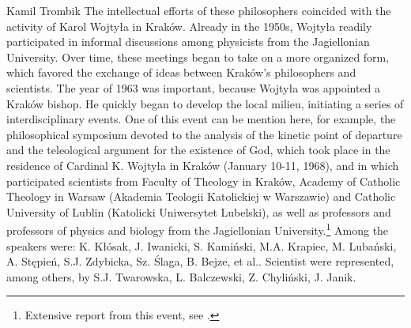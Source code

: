 \begin{artengenv}{Kamil Trombik}
The intellectual efforts of these philosophers coincided with the activity of Karol Wojtyła in Kraków. Already in the
1950s, Wojtyła readily participated in informal discussions among physicists from the Jagiellonian University. Over
time, these meetings began to take on a more organized form, which favored the exchange of ideas between Kraków's
philosophers and scientists. The year of 1963 was important, because Wojtyła was appointed a Kraków bishop. He quickly
began to develop the local milieu, initiating a series of interdisciplinary events. One of this event can be mention
here, for example, the philosophical symposium devoted to the analysis of the kinetic point of departure and the
teleological argument for the existence of God, which took place in the residence of Cardinal K. Wojtyła in Kraków
(January 10-11, 1968), and in which participated scientists from Faculty of Theology in Kraków, Academy of Catholic
Theology in Warsaw (Akademia Teologii Katolickiej w Warszawie) and Catholic University of Lublin (Katolicki Uniwersytet
Lubelski), as well as professors and professors of physics and biology from the Jagiellonian University.\footnote{
Extensive report from this event, see
\parencite{morawiec_sympozjum_1968}.
} Among the speakers were: K. Kłósak,
J. Iwanicki, S. Kamiński, M.A. Krapiec, M. Lubański, A. Stępień, S.J. Zdybicka, Sz. Ślaga, B. Bejze, et al.. Scientist
were represented, among others, by S.J. Twarowska, L. Balczewski, Z. Chyliński, J. Janik.


\end{artengenv}
